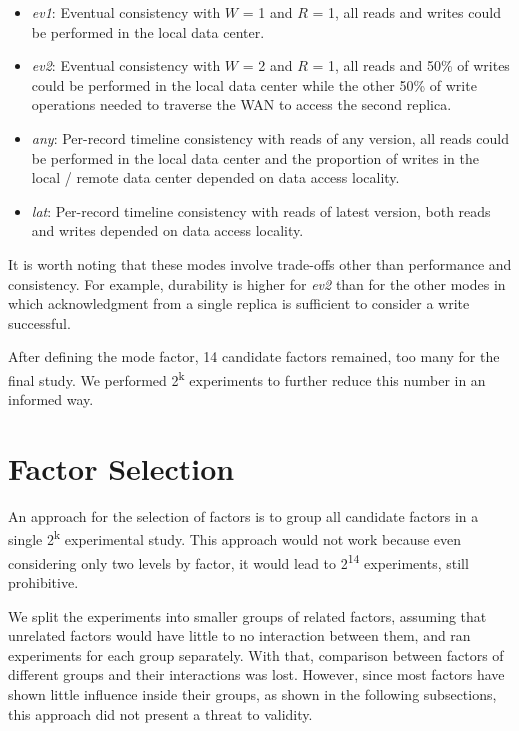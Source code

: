 \documentclass[man,floatsintext,12pt]{apa6}
\begin{document}
\begin{itemize}

\item \textit{ev1}: Eventual consistency with $W$ = 1 and $R$ = 1, all reads
and writes could be performed in the local data center.

\item \textit{ev2}: Eventual consistency with $W$ = 2 and $R$ = 1, all reads
and 50\% of writes could be performed in the local data center while the other
50\% of write operations needed to traverse the WAN to access the second
replica.

\item \textit{any}: Per-record timeline consistency with reads of any version,
all reads could be performed in the local data center and the proportion of
writes in the local / remote data center depended on data access locality.

\item \textit{lat}: Per-record timeline consistency with reads of latest
version, both reads and writes depended on data access locality.

\end{itemize}

It is worth noting that these modes involve trade-offs other than performance
and consistency. For example, durability is higher for \textit{ev2} than for
the other modes in which acknowledgment from a single replica is sufficient to
consider a write successful.

After defining the mode factor, 14 candidate factors remained, too many for the
final study. We performed 2\textsuperscript{k} experiments to further reduce
this number in an informed way.

\section{Factor Selection}

An approach for the selection of factors is to group all candidate factors in a
single 2\textsuperscript{k} experimental study. This approach would not work
because even considering only two levels by factor, it would lead to
2\textsuperscript{14} experiments, still prohibitive.

We split the experiments into smaller groups of related factors, assuming
that unrelated factors would have little to no interaction between them, and
ran experiments for each group separately. With that, comparison between
factors of different groups and their interactions was lost. However, since
most factors have shown little influence inside their groups, as shown in the
following subsections, this approach did not present a threat to validity.
\end{document}

